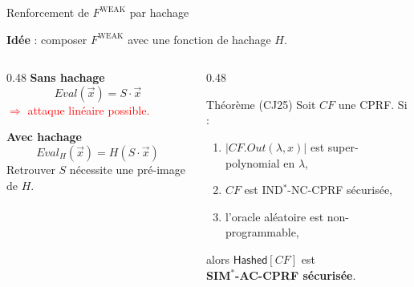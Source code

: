 \documentclass{beamer}
\begin{document}
\begin{frame}{Renforcement de $F^{\mathrm{WEAK}}$ par hachage}

\textbf{Idée} : composer $F^{\mathrm{WEAK}}$ avec une fonction de hachage $H$.

\vspace{0.3cm}

\begin{columns}[t]
\begin{column}{0.48\textwidth}
\textbf{Sans hachage}
\[
\mathit{Eval}(\vec{x}) = S \cdot \vec{x}
\]
\textcolor{red}{$\Rightarrow$ attaque linéaire possible.}

\vspace{0.4cm}

\textbf{Avec hachage}
\[
\mathit{Eval}_H(\vec{x}) = H(S \cdot \vec{x})
\]
Retrouver $S$ nécessite une pré-image de $H$.
\end{column}
\begin{column}{0.48\textwidth}
\begin{block}{Théorème (CJ25)}
Soit $CF$ une CPRF. Si :
\begin{enumerate}
    \item $|\mathit{CF.Out}(\lambda,x)|$ est super-polynomial en $\lambda$,
    \item $CF$ est IND$^*$-NC-CPRF sécurisée,
    \item l'oracle aléatoire est non-programmable,
\end{enumerate}
alors $\mathsf{Hashed}[CF]$ est\\
\textbf{SIM$^*$-AC-CPRF sécurisée}.
\end{block}
\end{column}
\end{columns}

\end{frame}
\end{document}
